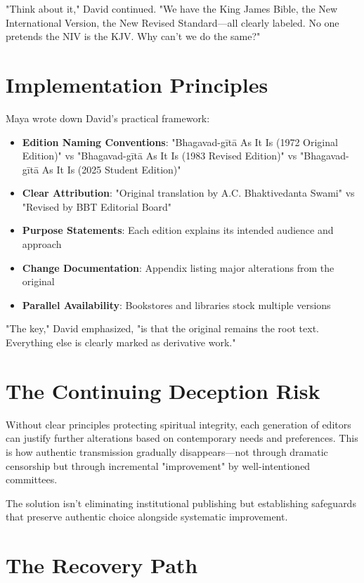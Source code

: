 \documentclass[11pt,twoside]{book}
\begin{document}
"Think about it," David continued. "We have the King James Bible, the New International Version, the New Revised Standard—all clearly labeled. No one pretends the NIV is the KJV. Why can't we do the same?"
\section*{Implementation Principles}
\label{sec:org2453225}

Maya wrote down David's practical framework:

\begin{itemize}
\item \textbf{\textbf{Edition Naming Conventions}}: "Bhagavad-gītā As It Is (1972 Original Edition)" vs "Bhagavad-gītā As It Is (1983 Revised Edition)" vs "Bhagavad-gītā As It Is (2025 Student Edition)"
\item \textbf{\textbf{Clear Attribution}}: "Original translation by A.C. Bhaktivedanta Swami" vs "Revised by BBT Editorial Board"
\item \textbf{\textbf{Purpose Statements}}: Each edition explains its intended audience and approach
\item \textbf{\textbf{Change Documentation}}: Appendix listing major alterations from the original
\item \textbf{\textbf{Parallel Availability}}: Bookstores and libraries stock multiple versions
\end{itemize}

"The key," David emphasized, "is that the original remains the root text. Everything else is clearly marked as derivative work."
\section*{The Continuing Deception Risk}
\label{sec:org6a9fbf1}

Without clear principles protecting spiritual integrity, each generation of editors can justify further alterations based on contemporary needs and preferences. This is how authentic transmission gradually disappears—not through dramatic censorship but through incremental "improvement" by well-intentioned committees.

The solution isn't eliminating institutional publishing but establishing safeguards that preserve authentic choice alongside systematic improvement.
\section*{The Recovery Path}
\label{sec:org1adaa9c}
\end{document}
